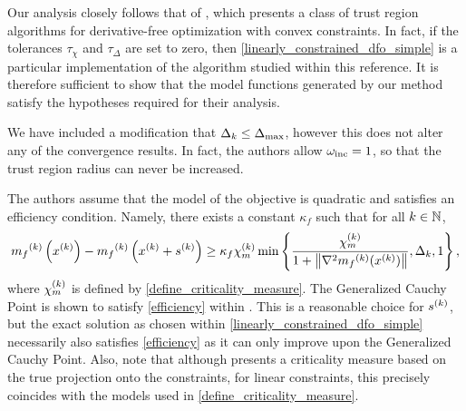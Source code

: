 

Our analysis closely follows that of \cite{Conejo:2013:GCT:2620806.2621814},
which presents a class of trust region algorithms for derivative-free optimization with convex constraints.
In fact, if the tolerances $\tau_{\chi}$ and $\tau_{\Delta}$ are set to zero,  
then \cref{linearly_constrained_dfo_simple} is a particular implementation of the algorithm studied within this reference.
It is therefore sufficient to show that the model functions generated by our method satisfy the hypotheses required for their analysis.

We have included a modification that $\Delta_k \le {\Delta_{\textrm{max}}}$, however this does not alter any of the convergence results.
In fact, the authors allow $\omega_{\text{inc}} = 1$, so that the trust region radius can never be increased.

The authors assume that the model of the objective is quadratic and satisfies an efficiency condition.
Namely, there exists a constant $\kappa_f$ such that for all $k \in \mathbb N$,
\begin{align}
\label{efficiency}
{{m}_f}^{(k)}\left(x^{(k)}\right) - {{m}_f}^{(k)}\left(x^{(k)} + {{s}^{(k)}}\right) \ge \kappa_f {\chi_m^{(k)}} \min\left\{ \frac{{\chi_m^{(k)}}}{1+\left\|\nabla^2 {{m}_f}^{(k)}(x^{(k)})\right\|}, \Delta_k, 1 \right\},
\end{align}
where ${\chi_m^{(k)}}$ is defined by \cref{define_criticality_measure}.
The Generalized Cauchy Point is shown to satisfy \cref{efficiency} within \cite{Conn:2000:TM:357813}.
This is a reasonable choice for ${{s}^{(k)}}$, but the exact solution as chosen within \cref{linearly_constrained_dfo_simple} 
necessarily also satisfies \cref{efficiency} as it can only improve upon the Generalized Cauchy Point.
Also, note that although \cite{Conejo:2013:GCT:2620806.2621814} presents a criticality measure based on the true projection onto the constraints,
for linear constraints, this precisely coincides with the models used in \cref{define_criticality_measure}.

